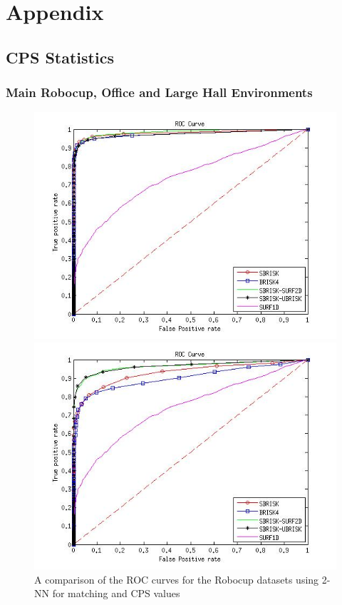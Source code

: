 \chapter{Appendix}
\label{app:appendixa}


\section{CPS Statistics}
\label{app:cps}

\subsection{Main Robocup, Office and Large Hall Environments}
\label{app:mrd}

\begin{figure}[ht!]
\begin{minipage}[b]{0.5\linewidth}
\includegraphics[scale=0.4]{../Drawings/RobocupDataset/ROC_General_KNN_consistent.jpg}
\caption{A comparison of the ROC curves for the Robocup datasets using 2-NN for matching and CPS values}
\label{fig:compareKNNConsist}
\end{minipage}
\hspace{0.5cm}
\begin{minipage}[b]{0.5\linewidth}
\includegraphics[scale=0.4]{../Drawings/RobocupDataset/ROC_General_Hamming_consistent.jpg}

\end{minipage}
\end{figure}
